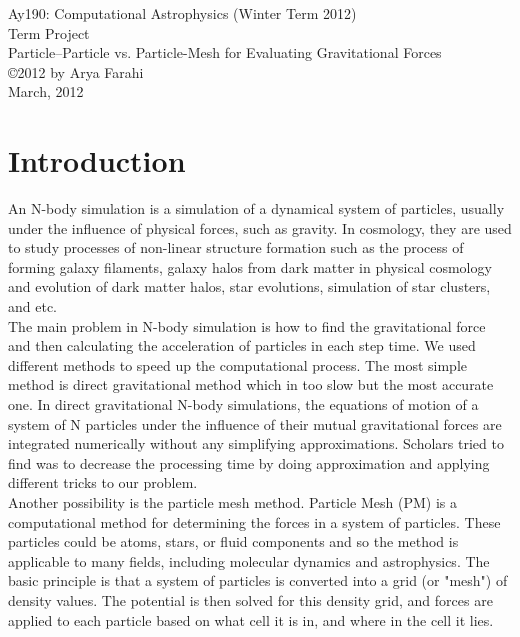 \documentclass[10pt]{article}
\begin{document}
\begin{center}
{\large Ay190: Computational Astrophysics (Winter Term 2012)} \\
{\large Term Project } \\
{\large Particle–Particle vs. Particle-Mesh for Evaluating Gravitational Forces}\\
\copyright 2012 by Arya Farahi \\
March, 2012
\end{center}

\section{Introduction}

An N-body simulation is a simulation of a dynamical system of particles, usually under the influence of physical forces, such as gravity. In cosmology, they are used to study processes of non-linear structure formation such as the process of forming galaxy filaments, galaxy halos from dark matter in physical cosmology and evolution of dark matter halos, star evolutions, simulation of star clusters, and etc. \\

The main problem in N-body simulation is how to find the gravitational force and then calculating the acceleration of particles in each step time. We used different methods to speed up the computational process. The most simple method is direct gravitational method which in too slow but the most accurate one. In direct gravitational N-body simulations, the equations of motion of a system of N  particles under the influence of their mutual gravitational forces are integrated numerically without any simplifying approximations. Scholars tried to find was to decrease the processing time by doing approximation and applying different tricks to our problem.\\

Another possibility is the particle mesh method. Particle Mesh (PM) is a computational method for determining the forces in a system of particles. These particles could be atoms, stars, or fluid components and so the method is applicable to many fields, including molecular dynamics and astrophysics. The basic principle is that a system of particles is converted into a grid (or "mesh") of density values. The potential is then solved for this density grid, and forces are applied to each particle based on what cell it is in, and where in the cell it lies.\\
\end{document}
